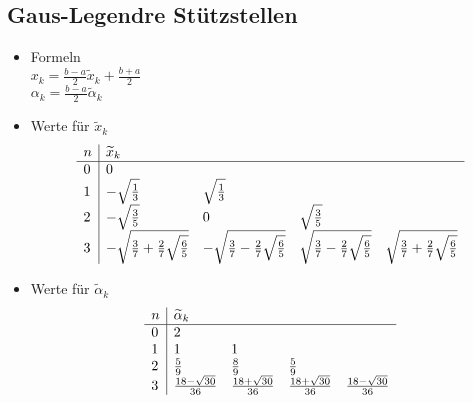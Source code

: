 \subsection{Gaus-Legendre Stützstellen}
\begin{itemize}

	\item Formeln \\
	$x_k = \frac{b-a}{2} \widetilde{x}_k + \frac{b+a}{2}$ \\
	$\alpha_k = \frac{b-a}{2} \widetilde{\alpha}_k$
	
	\item Werte für $\widetilde{x}_k$ \\
	\begin{displaymath}
		\begin{array}{l | llll}
			n & \widetilde{x}_k \\
			\hline
			0 & 0 \\
			1 & - \sqrt{\frac{1}{3}} & \sqrt{\frac{1}{3}} \\
			2 & - \sqrt{\frac{3}{5}} & 0 & \sqrt{\frac{3}{5}} \\
			3 & 
				- \sqrt{\frac{3}{7} + \frac{2}{7}\sqrt{\frac{6}{5}}} & 
				- \sqrt{\frac{3}{7} - \frac{2}{7}\sqrt{\frac{6}{5}}} & 
				\sqrt{\frac{3}{7} - \frac{2}{7}\sqrt{\frac{6}{5}}} & 
				\sqrt{\frac{3}{7} + \frac{2}{7}\sqrt{\frac{6}{5}}} \\
		\end{array}
	\end{displaymath}
	
	\item Werte für $\widetilde{\alpha}_k$ \\
	\begin{displaymath}
		\begin{array}{l | llll}
			n & \widetilde{\alpha}_k \\
			\hline
			0 & 2 \\
			1 & 1 & 1 \\
			2 & \frac{5}{9} & \frac{8}{9} & \frac{5}{9} \\
			3 & 
				\frac{18 - \sqrt{30}}{36} & 
				\frac{18 + \sqrt{30}}{36} & 
				\frac{18 + \sqrt{30}}{36} & 
				\frac{18 - \sqrt{30}}{36} \\
		\end{array}
	\end{displaymath}
		
\end{itemize}

